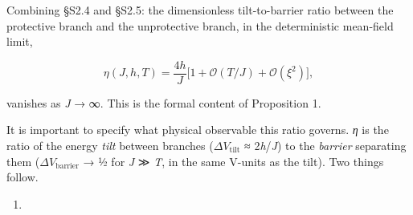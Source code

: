 \documentclass[11pt,letterpaper]{article}
\begin{document}
Combining §S2.4 and §S2.5: the dimensionless tilt-to-barrier ratio between the protective branch and the unprotective branch, in the deterministic mean-field limit,

\[
\eta(J, h, T) = \frac{4 h}{J}\bigl[1 + \mathcal{O}(T/J) + \mathcal{O}(\xi^2)\bigr],
\]

vanishes as \emph{J} → ∞. This is the formal content of Proposition 1.

It is important to specify what physical observable this ratio governs. \emph{η} is the ratio of the energy \emph{tilt} between branches (\(\Delta{}V_{\mathrm{tilt}}\) ≈ 2\emph{h}/\emph{J}) to the \emph{barrier} separating them (\(\Delta{}V_{\mathrm{barrier}}\) → ½ for \emph{J} ≫ \emph{T}, in the same V-units as the tilt). Two things follow.

\begin{enumerate}
\def\labelenumi{(\roman{enumi})}
\item

\end{enumerate}
\end{document}
